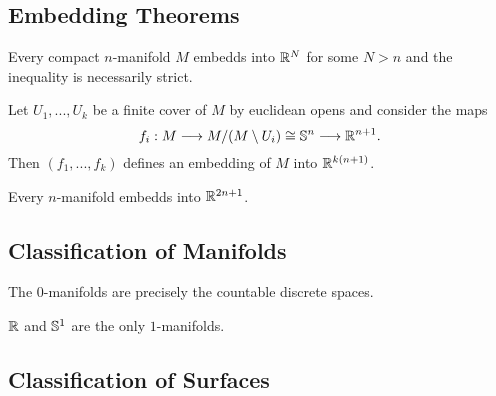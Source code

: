 	\newpage
	\subsection{Embedding Theorems}

	\begin{lemma}
		Every compact $n$-manifold $M$ embedds into $\R^N$ for some $N > n$ and the inequality is necessarily strict.
	\end{lemma}
	\begin{sketch}
		Let $U_1,...,U_k$ be a finite cover of $M$ by euclidean opens and consider the maps
		\begin{equation*}
			f_i: M \longrightarrow M / (M \setminus U_i)\isom \S^n \longrightarrow \R^{n+1}.
		\end{equation*}
		Then $(f_1,...,f_k)$ defines an embedding of $M$ into $\R^{k(n+1)}$.
	\end{sketch}

	\begin{theorem}
		Every $n$-manifold embedds into $\R^{2n+1}$.

	\end{theorem}

	\subsection{Classification of Manifolds}

	\begin{lemma}
		The $0$-manifolds are precisely the countable discrete spaces.
	\end{lemma}

	\begin{proposition}
		$\R$ and $\S^1$ are the only $1$-manifolds.
	\end{proposition}

	\begin{remark}
	\end{remark}

	\subsection{Classification of Surfaces}


